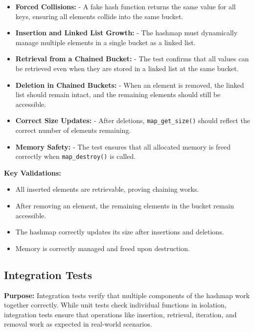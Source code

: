\documentclass[titlepage]{article}
\begin{document}
\begin{itemize}
    \item \textbf{Forced Collisions:}
    - A fake hash function returns the same value for all keys, ensuring all elements collide into the same bucket.

    \item \textbf{Insertion and Linked List Growth:}
    - The hashmap must dynamically manage multiple elements in a single bucket as a linked list.

    \item \textbf{Retrieval from a Chained Bucket:}
    - The test confirms that all values can be retrieved even when they are stored in a linked list at the same bucket.

    \item \textbf{Deletion in Chained Buckets:}
    - When an element is removed, the linked list should remain intact, and the remaining elements should still be accessible.

    \item \textbf{Correct Size Updates:}
    - After deletions, \texttt{map\_get\_size()} should reflect the correct number of elements remaining.

    \item \textbf{Memory Safety:}
    - The test ensures that all allocated memory is freed correctly when \texttt{map\_destroy()} is called.
\end{itemize}

\textbf{Key Validations:}
\begin{itemize}
    \item All inserted elements are retrievable, proving chaining works.
    \item After removing an element, the remaining elements in the bucket remain accessible.
    \item The hashmap correctly updates its size after insertions and deletions.
    \item Memory is correctly managed and freed upon destruction.
\end{itemize}


\subsection{Integration Tests}

\textbf{Purpose:}
Integration tests verify that multiple components of the hashmap work together correctly. While unit tests check individual functions in isolation, integration tests ensure that operations like insertion, retrieval, iteration, and removal work as expected in real-world scenarios.
\end{document}
